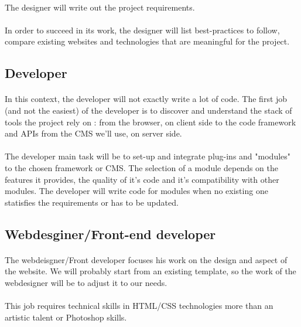 \paragraph{} The designer will write out the project requirements.

\paragraph{} In order to succeed in its work, the designer will list
best-practices to follow, compare existing websites and technologies that are
meaningful for the project.

\subsection{Developer}

\paragraph{} In this context, the developer will not exactly write a lot of
code. The first job (and not the easiest) of the developer is to discover and
understand the stack of tools the project rely on : from the browser, on client
side to the code framework and APIs from the CMS we'll use, on server side.

\paragraph{} The developer main task will be to set-up and integrate plug-ins
and "modules" to the chosen framework or CMS. The selection of a module depends
on the features it provides, the quality of it's code and it's compatibility
with other modules. The developer will write code for modules when no existing
one statisfies the requirements or has to be updated.

\subsection{Webdesginer/Front-end developer}

\paragraph{} The webdeisgner/Front developer focuses his work on the design and
aspect of the website. We will probably start from an existing template, so the
work of the webdesigner will be to adjust it to our needs.

\paragraph{} This job requires technical skills in HTML/CSS technologies more
than an artistic talent or Photoshop skills.
